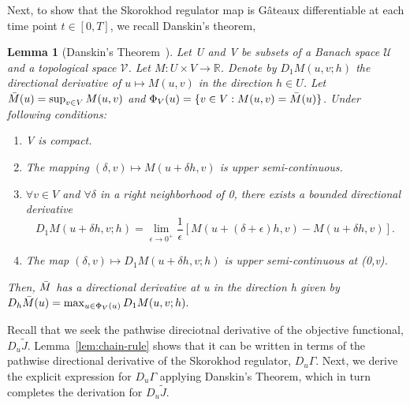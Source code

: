 \documentclass[11pt,leqno]{amsart}
\newtheorem{lemma}{Lemma}
\begin{document}
Next, to show that the Skorokhod regulator map is G\^{a}teaux differentiable at each time point $t \in [0,T]$, we recall Danskin's theorem,
\begin{lemma}[Danskin's Theorem~\citep{BERNHARD19951163}]\label{lem:5.0}
    Let U and V be subsets of a Banach space  $\mathcal{U}$ and a topological space $\mathcal{V}$. Let $M:U\times V\to\mathbb{R}$. Denote by $D_1M(u,v;h)$ the directional derivative of $u\mapsto M(u,v)$ in the direction $h\in U$. Let $\Bar{M}(u)=\sup_{v\in V}M(u,v)$ and $\Phi_V(u) = \{v\in V: M(u,v)=\Bar{M}(u)\}$. Under following conditions:
    \begin{enumerate}
        \item V is compact.
        \item The mapping $(\delta,v)\mapsto M(u+\delta h, v)$ is upper semi-continuous.
        \item $\forall v\in V$ and $\forall \delta$ in a right neighborhood of 0, there exists a bounded directional derivative
        $$D_1M(u+\delta h,v;h)=\lim_{\epsilon\to 0^+}\frac{1}{\epsilon}[M(u+(\delta +\epsilon)h,v)-M(u+\delta h,v)].$$
        \item The map $(\delta ,v)\mapsto D_1M(u+\delta h,v;h)$ is upper semi-continuous at (0,v).
    \end{enumerate}
    Then, $\Bar{M}$ has a directional derivative at u in the direction h given by
    $D_h\Bar{M}(u)=\max_{u\in\Phi_V(u)}D_1M(u,v;h).$
\end{lemma}

Recall that we seek the pathwise direciotnal derivative of the objective functional, $D_u\tilde{J}$. Lemma~\ref{lem:chain-rule} shows that it can be written in terms of the pathwise directional derivative of the Skorokhod regulator, $D_u\Gamma$. Next, we derive the explicit expression for $D_u\Gamma$ applying Danskin's Theorem, which in turn completes the derivation for $D_u\tilde{J}$.
\end{document}
